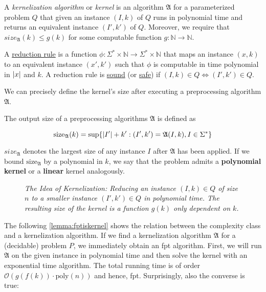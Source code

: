 \begin{definition}
A \textit{kernelization algorithm} or \textit{kernel} is an algorithm $\mathfrak{A}$ for a parameterized problem $Q$ that given an instance $(I,k)$ of $Q$ runs in polynomial time and returns an equivalent instance $(I', k')$ of $Q$. 
Moreover, we require that $size_{\mathfrak{A}}(k) \leq g(k)$ for some computable function $g:\mathbb{N} \rightarrow \mathbb{N}$.

A \underline{reduction rule} is a function $\phi:\Sigma^* \times \mathbb{N} \rightarrow \Sigma^* \times \mathbb{N}$ that maps an instance $(x,k)$ to an equivalent instance $(x',k')$ such that $\phi$ is computable in time polynomial in $\abs{x}$ and $k$.
A reduction rule is \underline{sound} (or \underline{safe}) if $(I, k) \in Q \Leftrightarrow (I',k') \in Q$.
\end{definition}

We can precisely define the kernel's size after executing a preprocessing algorithm $\mathfrak{A}$.

\begin{definition} The output size of a preprocessing algorithms $\mathfrak{A}$ is defined as 

    \[\mathrm{size}_{\mathfrak{A}}(k) = \sup\{\abs{I'} + k': (I',k')= \mathfrak{A}(I,k), I \in \Sigma^* \} \]
\end{definition}


\noindent $size_{\mathfrak{A}}$ denotes the largest size of any instance $I$ after $\mathfrak{A}$ has been applied.
If we bound $\mathrm{size}_{\mathfrak{A}}$ by a polynomial in $k$, we say that the problem admits a \textbf{polynomial kernel} or a \textbf{linear} kernel analogously.

\begin{figure}
    \centering
    
    \caption[Idea of kernelization]{\textit{The Idea of Kernelization: Reducing an instance $(I,k) \in Q$ of size $n$ to a smaller instance $(I', k') \in Q$ in polynomial time. 
    The resulting size of the kernel is a function $g(k)$ only dependent on $k$.}
    }
    \label{fig:kernelization}
\end{figure}
The following \cref{lemma:fptiskernel} shows the relation between the complexity class \FPT and a kernelization algorithm. 
If we find a kernelization algorithm $\mathfrak{A}$ for a (decidable) problem $P$, we immediately obtain an fpt algorithm.
First, we will run $\mathfrak{A}$ on the given instance in polynomial time and then solve the kernel with an exponential time algorithm.
The total running time is of order $\mathcal{O}(g(f(k)) \cdot \mathrm{poly}(n))$ and hence, fpt.
Surprisingly, also the converse is true:

